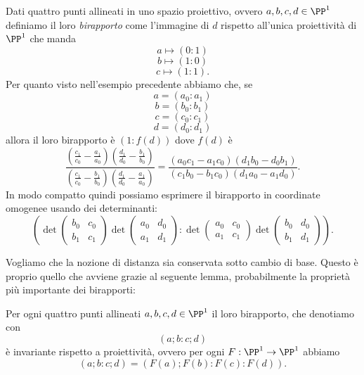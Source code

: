 \documentclass[11pt]{scrartcl}
\begin{document}
   	 \begin{definition}[Birapporto]
   	 	Dati quattro punti allineati in uno spazio proiettivo, ovvero $a,b,c,d\in \PP^1$ definiamo il loro \textit{birapporto} come l'immagine di $d$ rispetto all'unica proiettività di $\PP^1$ che manda 
   	 	$$a\mapsto (0:1)$$
   	 	$$b\mapsto (1:0)$$
   	 	$$c\mapsto (1:1).$$
   	 	Per quanto visto nell'esempio precedente abbiamo che, se 
   	 	$$a=(a_0:a_1)$$
   	 	$$b=(b_0:b_1)$$
   	 	$$c=(c_0:c_1)$$
   	 	$$d=(d_0:d_1)$$
   	 	allora il loro birapporto è $(1:f(d))$ dove $f(d)$ è
   	 	$$\frac{\left(\frac{c_1}{c_0}-\frac{a_1}{a_0}\right)\left(\frac{d_1}{d_0}-\frac{b_1}{b_0}\right)}{\left(\frac{c_1}{c_0}-\frac{b_1}{b_0}\right)\left(\frac{d_1}{d_0}-\frac{a_1}{a_0}\right)}=\frac{\left(a_0c_1-a_1c_0\right)\left(d_1b_0-d_0b_1\right)}{\left(c_1b_0-b_1c_0\right)\left(d_1a_0-a_1d_0\right)}.$$
   	 	In modo compatto quindi possiamo esprimere il birapporto in coordinate omogenee usando dei determinanti:
   	 	$$\left(\det\begin{pmatrix}
   	 		b_0 & c_0 \\
   	 		b_1 & c_1
   	 	\end{pmatrix}\det
   	 	\begin{pmatrix}
   	 		a_0 & d_0 \\
   	 		a_1 & d_1
   	 	\end{pmatrix}:\det
   	 	\begin{pmatrix}
   	 		a_0 & c_0 \\
   	 		a_1 & c_1
   	 	\end{pmatrix}\det
   	 	\begin{pmatrix}
	   	 	b_0 & d_0 \\
	   	 	b_1 & d_1
   	 	\end{pmatrix}
   	 	\right).$$
   	 \end{definition}
   	 Vogliamo che la nozione di distanza sia conservata sotto cambio di base. Questo è proprio quello che avviene grazie al seguente lemma, probabilmente la proprietà più importante dei birapporti:
   	 \begin{lemma}
   	 	Per ogni quattro punti allineati $a,b,c,d\in \PP^1$ il loro birapporto, che denotiamo con 
   	 	$$(a;b:c;d)$$
   	 	è invariante rispetto a proiettività, ovvero per ogni $F:\PP^1\to \PP^1$ abbiamo
   	 	$$(a;b:c;d)=\left(F(a);F(b):F(c):F(d)\right).$$
   	 \end{lemma}
\end{document}
